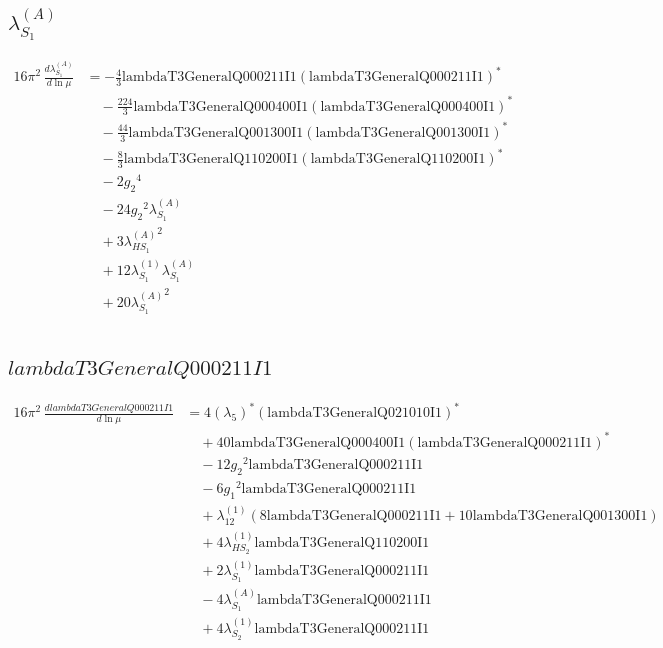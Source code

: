 \documentclass[10pt,a4paper]{article}
\begin{document}
\subsection*{$\lambda_{S_1}^{(A)}$}
\begin{align*}
16\pi^2\,\frac{d \lambda_{S_1}^{(A)}}{d\ln\mu} &=-\frac{4}{3} \text{lambdaT3GeneralQ000211I1} \left(\text{lambdaT3GeneralQ000211I1}\right)^{*} \\
&\quad -\frac{224}{3} \text{lambdaT3GeneralQ000400I1} \left(\text{lambdaT3GeneralQ000400I1}\right)^{*} \\
&\quad -\frac{44}{3} \text{lambdaT3GeneralQ001300I1} \left(\text{lambdaT3GeneralQ001300I1}\right)^{*} \\
&\quad -\frac{8}{3} \text{lambdaT3GeneralQ110200I1} \left(\text{lambdaT3GeneralQ110200I1}\right)^{*} \\
&\quad -2 {g_2}^4 \\
&\quad -24 {g_2}^2 {\lambda_{S_1}^{(A)}} \\
&\quad +3 {\lambda_{HS_1}^{(A)}}^2 \\
&\quad +12 {\lambda_{S_1}^{(1)}} {\lambda_{S_1}^{(A)}} \\
&\quad +20 {\lambda_{S_1}^{(A)}}^2 \\
\end{align*}
\subsection*{$lambdaT3GeneralQ000211I1$}
\begin{align*}
16\pi^2\,\frac{d lambdaT3GeneralQ000211I1}{d\ln\mu} &=4 \left({\lambda_5}\right)^{*} \left(\text{lambdaT3GeneralQ021010I1}\right)^{*} \\
&\quad +40 \text{lambdaT3GeneralQ000400I1} \left(\text{lambdaT3GeneralQ000211I1}\right)^{*} \\
&\quad -12 {g_2}^2 \text{lambdaT3GeneralQ000211I1} \\
&\quad -6 {g_1}^2 \text{lambdaT3GeneralQ000211I1} \\
&\quad +{\lambda_{12}^{(1)}} (8 \text{lambdaT3GeneralQ000211I1}+10 \text{lambdaT3GeneralQ001300I1}) \\
&\quad +4 {\lambda_{HS_2}^{(1)}} \text{lambdaT3GeneralQ110200I1} \\
&\quad +2 {\lambda_{S_1}^{(1)}} \text{lambdaT3GeneralQ000211I1} \\
&\quad -4 {\lambda_{S_1}^{(A)}} \text{lambdaT3GeneralQ000211I1} \\
&\quad +4 {\lambda_{S_2}^{(1)}} \text{lambdaT3GeneralQ000211I1} \\
\end{align*}
\end{document}
